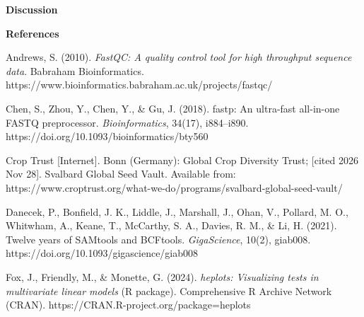 \documentclass[12pt, a4paper]{article}
\begin{document}
\newpage 

\begin{center}
    \textbf{\large Discussion}
\end{center}
\par

\newpage
\begin{center}
    \textbf{References}
\end{center}


\par\hangindent=0.5in
\noindent Andrews, S. (2010). \textit{FastQC: A quality control tool for high throughput sequence data}. Babraham Bioinformatics. https://www.bioinformatics.babraham.ac.uk/projects/fastqc/

\par\hangindent=0.5in
\noindent Chen, S., Zhou, Y., Chen, Y., \& Gu, J. (2018). fastp: An ultra-fast all-in-one FASTQ preprocessor. \textit{Bioinformatics}, 34(17), i884--i890. https://doi.org/10.1093/bioinformatics/bty560

\par\hangindent=0.5in
\noindent Crop Trust [Internet]. Bonn (Germany): Global Crop Diversity Trust; [cited 2026 Nov 28]. Svalbard Global Seed Vault. Available from: \\ https://www.croptrust.org/what-we-do/programs/svalbard-global-seed-vault/

\par\hangindent=0.5in
\noindent Danecek, P., Bonfield, J. K., Liddle, J., Marshall, J., Ohan, V., Pollard, M. O., Whitwham, A., Keane, T., McCarthy, S. A., Davies, R. M., \& Li, H. (2021). Twelve years of SAMtools and BCFtools. \textit{GigaScience}, 10(2), giab008. https://doi.org/10.1093/gigascience/giab008

\par\hangindent=0.5in
\noindent Fox, J., Friendly, M., \& Monette, G. (2024). \textit{heplots: Visualizing tests in multivariate linear models} (R package). Comprehensive R Archive Network (CRAN). https://CRAN.R-project.org/package=heplots
\end{document}
